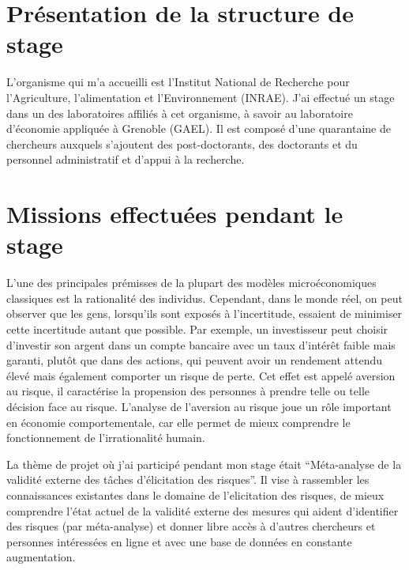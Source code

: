 \documentclass[12pt]{article}
\begin{document}
\section{Présentation de la structure de stage}
\label{sec:second}

L'organisme qui m'a accueilli est l'Institut National de Recherche pour
l'Agriculture, l'alimentation et l'Environnement (INRAE). J'ai effectué
un stage dans un des laboratoires affiliés à cet organisme, à savoir au
laboratoire d'économie appliquée à Grenoble (GAEL). Il est composé d'une
quarantaine de chercheurs auxquels s'ajoutent des post-doctorants, des
doctorants et du personnel administratif et d'appui à la recherche.

\section{Missions effectuées pendant le stage}
\label{sec:third}

L'une des principales prémisses de la plupart des modèles
microéconomiques classiques est la rationalité des individus. Cependant,
dans le monde réel, on peut observer que les gens, lorsqu'ils sont
exposés à l'incertitude, essaient de minimiser cette incertitude autant
que possible. Par exemple, un investisseur peut choisir d'investir son
argent dans un compte bancaire avec un taux d'intérêt faible mais
garanti, plutôt que dans des actions, qui peuvent avoir un rendement
attendu élevé mais également comporter un risque de perte. Cet effet est
appelé aversion au risque, il caractérise la propension des personnes à
prendre telle ou telle décision face au risque. L'analyse de l'aversion
au risque joue un rôle important en économie comportementale, car elle
permet de mieux comprendre le fonctionnement de l'irrationalité humain.

La thème de projet où j'ai participé pendant mon stage était
``Méta-analyse de la validité externe des tâches d'élicitation des
risques''. Il vise à rassembler les connaissances existantes dans le
domaine de l'elicitation des risques, de mieux comprendre l'état actuel
de la validité externe des mesures qui aident d'identifier des risques
(par méta-analyse) et donner libre accès à d'autres chercheurs et
personnes intéressées en ligne et avec une base de données en constante
augmentation.
\end{document}
